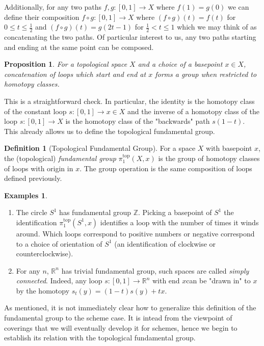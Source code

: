 \documentclass{article}
\theoremstyle{definition}
\newtheorem{definition}[theorem]{Definition}
\newtheorem{examples}[theorem]{Examples}
\theoremstyle{remark}
\theoremstyle{plain}
\newtheorem{proposition}[theorem]{Proposition}
\newcommand{\R}{\mathbb{R}}
\newcommand{\Z}{\mathbb{Z}}
\begin{document}
\indent Additionally, for any two paths $f,g: [0,1] \to X$ where $f(1) = g(0)$ we can define their composition $f \circ g: [0,1] \to X$ where $(f \circ g )(t) = f(t)$ for $0 \leq t \leq \frac{1}{2}$ and $(f \circ g)(t) = g(2t - 1)$ for $ \frac{1}{2} < t \leq 1$ which we may think of as concatenating the two paths.
Of particular interest to us, any two paths starting and ending at the same point can be composed.

\begin{proposition}
	For a topological space $X$ and a choice of a basepoint $x \in X$, concatenation of loops which start and end at $x$ forms a group when restricted to homotopy classes.
\end{proposition}

This is a straightforward check. 
In particular, the identity is the homotopy class of the constant loop $s: [0,1] \to x \in X$ and the inverse of a homotopy class of the loop $s: [0,1] \to X$ is the homotopy class of the "backwards" path $s(1-t)$.
This already allows us to define the topological fundamental group.
\begin{definition}[Topological Fundamental Group]
	For a space $X$ with basepoint $x$, the (topological) \textit{fundamental group} $\pi^{\text{top}}_1(X,x)$	is the group of homotopy classes of loops with origin in $x$.
	The group operation is the same composition of loops defined previously.
\end{definition}

\begin{examples} \text{} 
	\begin{enumerate}
		\item The circle $S^1$ has fundamental group $\Z$. 
			Picking a basepoint of $S^1$ the identification $\pi_1^{\text{top}}(S^1,x)$ identifies a loop with the number of times it winds around.
			Which loops correspond to positive numbers or negative correspond to a choice of orientation of $S^1$ (an identification of clockwise or counterclockwise). 
		\item For any $n$, $\R^n$ has trivial fundamental group, such spaces are called \textit{simply connected}.
			Indeed, any loop $s: [0,1] \to \R^n$ with end $x $can be "drawn in" to $x$ by the homotopy $s_t(y) = (1-t)s(y) + tx$.
	\end{enumerate}
	
\end{examples}

As mentioned, it is not immediately clear how to generalize this definition of the fundamental group to the scheme case.
It is intead from the viewpoint of coverings that we will eventually develop it for schemes, hence we begin to establish its relation with the topological fundamental group.
\end{document}

